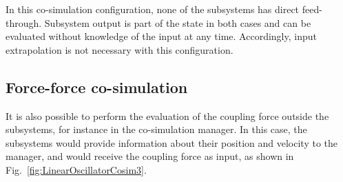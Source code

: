 \documentclass[fleqn,11pt]{article}
\begin{document}
In this co-simulation configuration, none of the subsystems has direct feed-through.
Subsystem output is part of the state in both cases and can be evaluated without knowledge of the  input at any time.
Accordingly, input extrapolation is not necessary with this configuration.


\subsection{Force-force co-simulation}
\label{ForceForce}

It is also possible to perform the evaluation of the coupling force outside the subsystems, for instance in the co-simulation manager.
In this case, the subsystems would provide information about their position and velocity to the manager, and would receive the coupling force as input, as shown in Fig.~\ref{fig:LinearOscillatorCosim3}.
\end{document}
